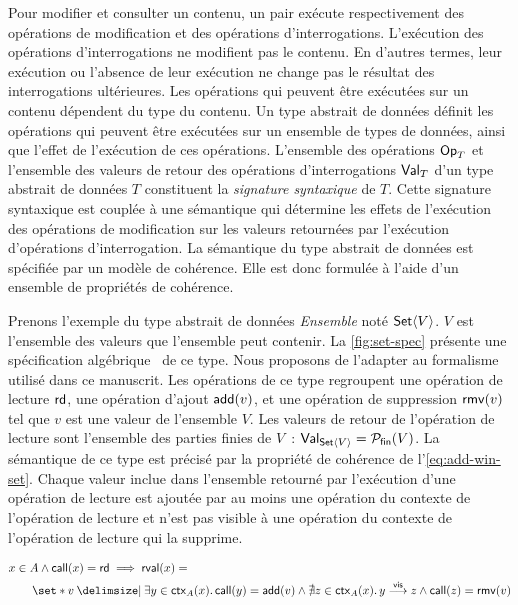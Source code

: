 Pour modifier et consulter un contenu, un pair exécute respectivement des opérations de modification et des opérations d'interrogations.
L'exécution des opérations d'interrogations ne modifient pas le contenu.
En d'autres termes, leur exécution ou l'absence de leur exécution ne change pas le résultat des interrogations ultérieures.
Les opérations qui peuvent être exécutées sur un contenu dépendent du type du contenu.
Un type abstrait de données définit les opérations qui peuvent être exécutées sur un ensemble de types de données, ainsi que l'effet de l'exécution de ces opérations.
L'ensemble des opérations $\trm{Op}_T$ et l'ensemble des valeurs de retour des opérations d'interrogations $\trm{Val}_T$ d'un type abstrait de données $T$ constituent la \emph{signature syntaxique} de $T$.
Cette signature syntaxique est couplée à une sémantique qui détermine les effets de l'exécution des opérations de modification sur les valeurs retournées par l'exécution d'opérations d'interrogation.
La sémantique du type abstrait de données est spécifiée par un modèle de cohérence.
Elle est donc formulée à l'aide d'un ensemble de propriétés de cohérence.

Prenons l'exemple du type abstrait de données \emph{Ensemble} noté $\trm{Set}\tuple*{V}$.
$V$ est l'ensemble des valeurs que l'ensemble peut contenir.
La \autoref{fig:set-spec} présente une spécification algébrique~\autocite{wirsing1990_algebraicspec} de ce type.
Nous proposons de l'adapter au formalisme utilisé dans ce manuscrit.
Les opérations de ce type regroupent une opération de lecture $\trm{rd}$, une opération d'ajout $\trm{add}(v)$, et une opération de suppression $\trm{rmv}(v)$ tel que $v$ est une valeur de l'ensemble $V$.
Les valeurs de retour de l'opération de lecture sont l'ensemble des parties finies de $V$~: $\trm{Val}_{\trm{Set}\tuple*{V}} = \powerfset{V}$.
La sémantique de ce type est précisé par la propriété de cohérence de l'\autoref{eq:add-win-set}.
Chaque valeur inclue dans l'ensemble retourné par l'exécution d'une opération de lecture est ajoutée par au moins une opération du contexte de l'opération de lecture et n'est pas visible à une opération du contexte de l'opération de lecture qui la supprime.

\begin{equation}\begin{split}\label{eq:add-win-set}
\MoveEqLeft x \in A \land \trm{call}(x) = \trm{rd} \implies \trm{rval}(x) =\\
    &\set*{v \given \exists y \in \trm{ctx}_A(x) \qsep \trm{call}(y) = \trm{add}(v) \land \nexists z \in \trm{ctx}_A(x) \qsep y \vis z \land \trm{call}(z) = \trm{rmv}(v)}
\end{split}\end{equation}

